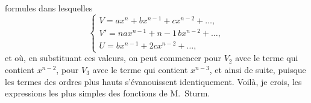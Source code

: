 \documentclass[11pt]{article}
\begin{document}

formules dans lesquelles
\[
\begin{cases} V = ax^{n} + bx^{n - 1} + cx^{n - 2} + \ldots,\\
V' = nax^{n - 1} + n-1\,bx^{n - 2} + \ldots,\\
U = bx^{n - 1} + 2cx^{n - 2} + \ldots,
\end{cases}
\]
et o\`u, en substituant ces valeurs, on peut commencer pour $V_{2}$ avec le terme qui contient
$x^{n - 2}$, pour $V_{3}$ avec le terme qui contient $x^{n - 3}$, et ainsi de suite, puisque les termes des
ordres plus hauts s'\'evanouissent identiquement. Voil\`a, je crois, les expressions les plus
simples des fonctions de M.~Sturm.
\end{document}
